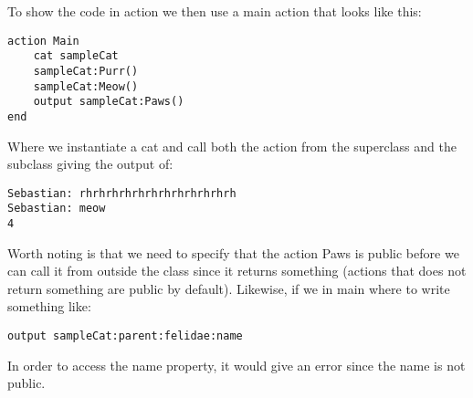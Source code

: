 To show the code in action we then use a main action that looks like this:

\begin{lstlisting}[language=Quorum]
action Main
    cat sampleCat
    sampleCat:Purr()
    sampleCat:Meow()
    output sampleCat:Paws()
end
\end{lstlisting}

Where we instantiate a cat and call both the action from the superclass and the subclass giving the output of: 

\lstinline!Sebastian: rhrhrhrhrhrhrhrhrhrhrhrh!\\
\lstinline!Sebastian: meow!\\
\lstinline!4!

Worth noting is that we need to specify that the action Paws is public before we can call it from outside the class since it returns something (actions that does not return something are public by default). Likewise, if we in main where to write something like:

\begin{lstlisting}[language=Quorum]
output sampleCat:parent:felidae:name
\end{lstlisting}

In order to access the name property, it would give an error since the name is not public.